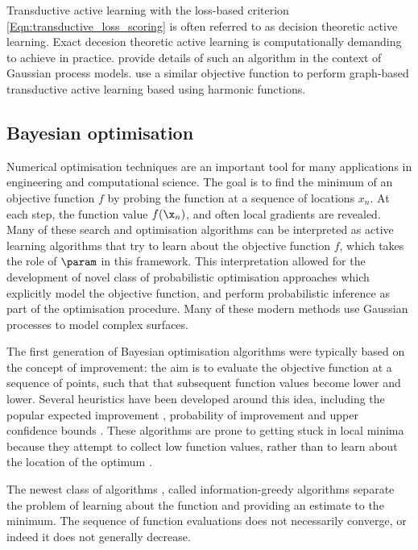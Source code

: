 Transductive active learning with the loss-based criterion \eqref{Eqn:transductive_loss_scoring} is often referred to as decision theoretic active learning. Exact decesion theoretic active learning is computationally demanding to achieve in practice. \citet{Kapoor2007} provide details of such an algorithm in the context of Gaussian process models. \citet{Zhu2003active} use a similar objective function to perform graph-based transductive active learning based using harmonic functions.

\subsection{Bayesian optimisation}

Numerical optimisation techniques are an important tool for many applications in engineering and computational science.
The goal is to find the minimum of an objective function $f$ by probing the function at a sequence of locations $x_n$. At each step, the function value $f(\x_n)$, and often local gradients are revealed. Many of these search and optimisation algorithms can be interpreted as active learning algorithms that try to learn about the objective function $f$, which takes the role of $\param$ in this framework. This interpretation allowed for the development of novel class of probabilistic optimisation approaches which explicitly model the objective function, and perform probabilistic inference as part of the optimisation procedure. Many of these modern methods use Gaussian processes to model complex surfaces.

The first generation of Bayesian optimisation algorithms were typically based on the concept of improvement: the aim is to evaluate the objective function at a sequence of points, such that that subsequent function values become lower and lower. Several heuristics have been developed around this idea, including the popular expected improvement \citep{Mockus1982,Jones1998, Frean2008}, probability of improvement \citep{Jones2001,Lizotte2008} and upper confidence bounds \citep{Srinivas2009}. These algorithms are prone to getting stuck in local minima because they attempt to collect low function values, rather than to learn about the location of the optimum \citep{Hennig2012entropy}.

The newest class of algorithms \citep{Hennig2012entropy}, called information-greedy algorithms separate the problem of learning about the function and providing an estimate to the minimum. The sequence of function evaluations does not necessarily converge, or indeed it does not generally decrease.


